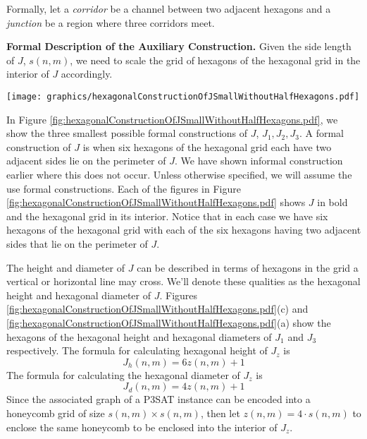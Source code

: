 \documentclass[10pt]{CSUNthesis}
\theoremstyle{plain}%
\theoremstyle{definition}
\theoremstyle{remark}
\begin{document}
Formally, let a \textit{corridor} be a channel between two adjacent hexagons and a \textit{junction} be a region where three corridors meet.

\textbf{Formal Description of the Auxiliary Construction.}
Given the side length of $J$, $s(n,m)$, we need to scale the grid of hexagons of the hexagonal grid in the interior of $J$ accordingly.

\begin{minipage}{\linewidth}
\begin{center}
\texttt{[image: graphics/hexagonalConstructionOfJSmallWithoutHalfHexagons.pdf]}
\label{fig:hexagonalConstructionOfJSmallWithoutHalfHexagons.pdf}
\end{center}
\end{minipage}

In Figure \ref{fig:hexagonalConstructionOfJSmallWithoutHalfHexagons.pdf}, we show the three smallest possible formal constructions of $J$, $J_1, J_2, J_3$.  
A formal construction of $J$ is when six hexagons of the hexagonal grid each have two adjacent sides lie on the perimeter of $J$.
We have shown informal construction earlier where this does not occur.
Unless otherwise specified, we will assume the use formal constructions.
Each of the figures in Figure \ref{fig:hexagonalConstructionOfJSmallWithoutHalfHexagons.pdf} shows $J$ in bold and the hexagonal grid in its interior.
Notice that in each case we have six hexagons of the hexagonal grid with each of the six hexagons having two adjacent sides that lie on the perimeter of $J$.

The height and diameter of $J$ can be described in terms of hexagons in the grid a vertical or horizontal line may cross. 
We'll denote these qualities as the hexagonal height and hexagonal diameter of $J$.  
Figures \ref{fig:hexagonalConstructionOfJSmallWithoutHalfHexagons.pdf}(c) and \ref{fig:hexagonalConstructionOfJSmallWithoutHalfHexagons.pdf}(a) show the hexagons of the hexagonal height and hexagonal diameters of $J_1$ and $J_3$ respectively.  
The formula for calculating hexagonal height of $J_z$ is 
\begin{equation}\label{eqn:Jh}
J_h (n,m) = 6z(n,m)+1
\end{equation}
The formula for calculating the hexagonal diameter of $J_z$ is 
\begin{equation}\label{eqn:Jd}
J_d (n,m) = 4z(n,m)+1
\end{equation}
Since the associated graph of a P3SAT instance can be encoded into a honeycomb grid of size $s(n,m) \times s(n,m)$, then let $z(n,m)=4\cdot s(n,m)$ to enclose the same honeycomb to be enclosed into the interior of $J_z$.
\end{document}
